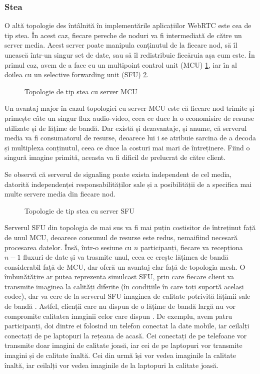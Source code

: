 \subsubsection{Stea}
\label{sec:ch3sec1subsec2subsubsec2}
\indent \par O altă topologie des întâlnită în implementările aplicațiilor WebRTC este cea de tip stea. În acest caz, fiecare pereche de noduri va fi intermediată de către un server media. Acest server poate manipula conținutul de la fiecare nod, să îl unească într-un singur set de date, sau să îl redistribuie fiecăruia așa cum este. În primul caz, avem de a face cu un multipoint control unit (MCU) \ref{WebRTCStarMCU}, iar în al doilea cu un selective forwarding unit (SFU) \ref{WebRTCStarSFU}.
\begin{figure}[H]
    \centering
    \scalebox{0.65}{}
    \caption{Topologie de tip stea cu server MCU}
    \label{WebRTCStarMCU}
\end{figure}
\indent \par Un avantaj major în cazul topologiei cu server MCU este că fiecare nod trimite și primește câte un singur flux audio-video, ceea ce duce la o economisire de resurse utilizate și de lățime de bandă. Dar există și dezavantaje, și anume, că serverul media va fi consumatorul de resurse, deoarece lui i se atribuie sarcina de a decoda și multiplexa conținutul, ceea ce duce la costuri mai mari de întreținere. Fiind o singură imagine primită, aceasta va fi dificil de prelucrat de către client.
\indent \par Se observă că serverul de signaling poate exista independent de cel media, datorită independenței responsabilităților sale și a posibilității de a specifica mai multe servere media din fiecare nod.
\begin{figure}[H]
    \centering
    \scalebox{0.65}{}
    \caption{Topologie de tip stea cu server SFU}
    \label{WebRTCStarSFU}
\end{figure}
\indent \par Serverul SFU din topologia de mai sus va fi mai puțin costisitor de întreținut față de unul MCU, deoarece consumul de resurse este redus, nemaifiind necesară procesarea datelor. Însă, într-o sesiune cu \(n\) participanți, fiecare va recepționa \(n-1\) fluxuri de date și va trasmite unul, ceea ce crește lățimea de bandă considerabil față de MCU, dar oferă un avantaj clar față de topologia mesh. O îmbunătățire ar putea reprezenta simulcast SFU, prin care fiecare client va transmite imaginea la calități diferite (în condițiile în care toți suportă același codec), dar va cere de la serverul SFU imaginea de calitate potrivită lățimii sale de bandă \cite{SFU2020}. Astfel, clienții care nu dispun de o lățime de bandă largă nu vor compromite calitatea imaginii celor care dispun \cite{SFU2020}. De exemplu, avem patru participanți, doi dintre ei folosind un telefon conectat la date mobile, iar ceilalți conectați de pe laptopuri la rețeaua de acasă. Cei conectați de pe telefoane vor transmite doar imagini de calitate joasă, iar cei de pe laptopuri vor transmite imagini și de calitate înaltă. Cei din urmă își vor vedea imaginile la calitate înaltă, iar ceilalți vor vedea imaginile de la laptopuri la calitate joasă.


